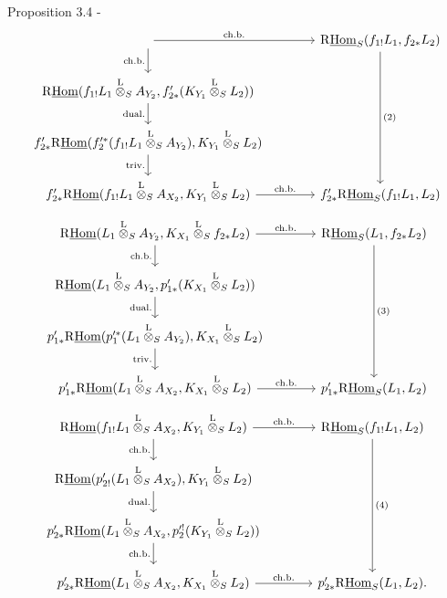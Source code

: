 \begin{statement}{Proposition 3.4 -}
\[\begin{tikzcd}[column sep=3.7em,row sep=1.7em]
  \arrow[r,"\mathrm{ch.b.}"] \arrow[d,"\mathrm{ch.b.}"']
& \mathrm{R}\underline{\mathrm{Hom}}_S(f_{1!}L_1,f_{2*}L_2) \arrow[ddd,"(2)"] \\
\mathrm{R}\underline{\mathrm{Hom}}(f_{1!}L_1\overset{\mathrm{L}}{\otimes}_S A_{Y_2},f'_{2*}(K_{Y_1}\overset{\mathrm{L}}{\otimes}_S L_2)) \arrow[d,"
\mathrm{dual.}"']
& \\
f'_{2*}\mathrm{R}\underline{\mathrm{Hom}}(f_2'^*(f_{1!}L_1\overset{\mathrm{L}}{\otimes}_S A_{Y_2}),K_{Y_1}\overset{\mathrm{L}}{\otimes}_S L_2) \arrow[d,"\mathrm{triv.}"']
& \\
f'_{2*}\mathrm{R}\underline{\mathrm{Hom}}(f_{1!}L_1\overset{\mathrm{L}}{\otimes}_S A_{X_2},K_{Y_1}\overset{\mathrm{L}}{\otimes}_S L_2) \arrow[r,"\mathrm{ch.b.}"]
& f'_{2*}\mathrm{R}\underline{\mathrm{Hom}}_S(f_{1!}L_1,L_2)
\end{tikzcd}
\]
\[
\begin{tikzcd}[column sep=3.7em,row sep=1.7em]
\mathrm{R}\underline{\mathrm{Hom}}(L_1\overset{\mathrm{L}}{\otimes}_S A_{Y_2},K_{X_1}\overset{\mathrm{L}}{\otimes}_S f_{2*}L_2)
  \arrow[r,"\mathrm{ch.b.}"] \arrow[d,"\mathrm{ch.b.}"']
& \mathrm{R}\underline{\mathrm{Hom}}_S(L_1,f_{2*}L_2) \arrow[ddd,"(3)"] \\
\mathrm{R}\underline{\mathrm{Hom}}(L_1\overset{\mathrm{L}}{\otimes}_S A_{Y_2},p'_{1*}(K_{X_1}\overset{\mathrm{L}}{\otimes}_S L_2)) \arrow[d,"\mathrm{dual.}"']
& \\
p'_{1*}\mathrm{R}\underline{\mathrm{Hom}}(p_1'^*(L_1\overset{\mathrm{L}}{\otimes}_S A_{Y_2}),K_{X_1}\overset{\mathrm{L}}{\otimes}_S L_2) \arrow[d,"\mathrm{triv.}"']
& \\
p'_{1*}\mathrm{R}\underline{\mathrm{Hom}}(L_1\overset{\mathrm{L}}{\otimes}_S A_{X_2},K_{X_1}\overset{\mathrm{L}}{\otimes}_S L_2) \arrow[r,"\mathrm{ch.b.}"]
& p'_{1*}\mathrm{R}\underline{\mathrm{Hom}}_S(L_1,L_2)
\end{tikzcd}
\]
\[
\begin{tikzcd}[column sep=3.7em,row sep=1.7em]
\mathrm{R}\underline{\mathrm{Hom}}(f_{1!}L_1\overset{\mathrm{L}}{\otimes}_S A_{X_2},K_{Y_1}\overset{\mathrm{L}}{\otimes}_S L_2)
  \arrow[r,"\mathrm{ch.b.}"] \arrow[d,"\mathrm{ch.b.}"']
& \mathrm{R}\underline{\mathrm{Hom}}_S(f_{1!}L_1,L_2) \arrow[ddd,"(4)"] \\
\mathrm{R}\underline{\mathrm{Hom}}(p'_{2!}(L_1\overset{\mathrm{L}}{\otimes}_S A_{X_2}),K_{Y_1}\overset{\mathrm{L}}{\otimes}_S L_2) \arrow[d,"\mathrm{dual.}"']
& \\
p'_{2*}\mathrm{R}\underline{\mathrm{Hom}}(L_1\overset{\mathrm{L}}{\otimes}_S A_{X_2},p_2'^!(K_{Y_1}\overset{\mathrm{L}}{\otimes}_S L_2)) \arrow[d,"\mathrm{ch.b.}"']
& \\
p'_{2*}\mathrm{R}\underline{\mathrm{Hom}}(L_1\overset{\mathrm{L}}{\otimes}_S A_{X_2},K_{X_1}\overset{\mathrm{L}}{\otimes}_S L_2) \arrow[r,"\mathrm{ch.b.}"]
& p'_{2*}\mathrm{R}\underline{\mathrm{Hom}}_S(L_1,L_2).
\end{tikzcd}
\]
\end{statement}
